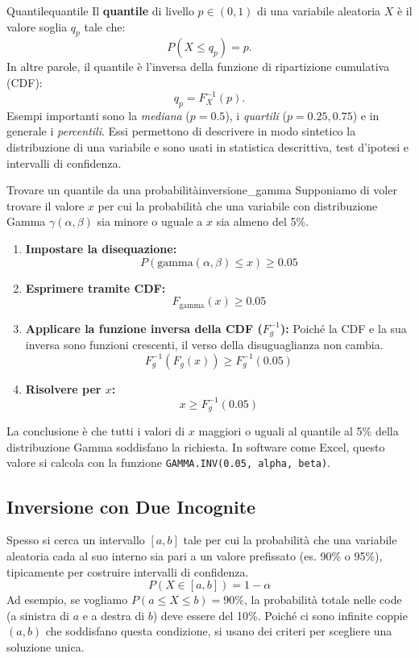 \begin{nota}{Quantile}{quantile}
Il \textbf{quantile} di livello \(p \in (0,1)\) di una variabile aleatoria \(X\) è il valore soglia \(q_p\) tale che:
\[
P(X \leq q_p) = p.
\]
In altre parole, il quantile è l’inversa della funzione di ripartizione cumulativa (CDF): 
\[
q_p = F_X^{-1}(p).
\]
Esempi importanti sono la \textit{mediana} (\(p=0.5\)), i \textit{quartili} (\(p=0.25,0.75\)) e in generale i \textit{percentili}. 
Essi permettono di descrivere in modo sintetico la distribuzione di una variabile e sono usati in statistica descrittiva, test d’ipotesi e intervalli di confidenza.
\end{nota}
\begin{esempio}{Trovare un quantile da una probabilità}{inversione_gamma}
Supponiamo di voler trovare il valore \( x \) per cui la probabilità che una variabile con distribuzione Gamma \( \gamma(\alpha, \beta) \) sia minore o uguale a \( x \) sia almeno del 5\%.
\begin{enumerate}
    \item \textbf{Impostare la disequazione:}
    \[
    P(\text{gamma}(\alpha, \beta) \le x) \ge 0.05
    \]
    \item \textbf{Esprimere tramite CDF:}
    \[
    F_{\text{gamma}}(x) \ge 0.05
    \]
    \item \textbf{Applicare la funzione inversa della CDF ($F_g^{-1}$):} Poiché la CDF e la sua inversa sono funzioni crescenti, il verso della disuguaglianza non cambia.
    \[
    F_g^{-1}(F_g(x)) \ge F_g^{-1}(0.05)
    \]
    \item \textbf{Risolvere per \(x\):}
    \[
    x \ge F_g^{-1}(0.05)
    \]
\end{enumerate}
La conclusione è che tutti i valori di \( x \) maggiori o uguali al quantile al 5\% della distribuzione Gamma soddisfano la richiesta. In software come Excel, questo valore si calcola con la funzione \texttt{GAMMA.INV(0.05, alpha, beta)}.
\end{esempio}

\subsection{Inversione con Due Incognite}\label{ssec:inversione_due_incognite}
Spesso si cerca un intervallo \( [a, b] \) tale per cui la probabilità che una variabile aleatoria cada al suo interno sia pari a un valore prefissato (es. 90\% o 95\%), tipicamente per costruire intervalli di confidenza.
\[
P(X \in [a, b]) = 1 - \alpha
\]
Ad esempio, se vogliamo \( P(a \le X \le b) = 90\% \), la probabilità totale nelle code (a sinistra di \(a\) e a destra di \(b\)) deve essere del 10\%. Poiché ci sono infinite coppie \( (a, b) \) che soddisfano questa condizione, si usano dei criteri per scegliere una soluzione unica.

